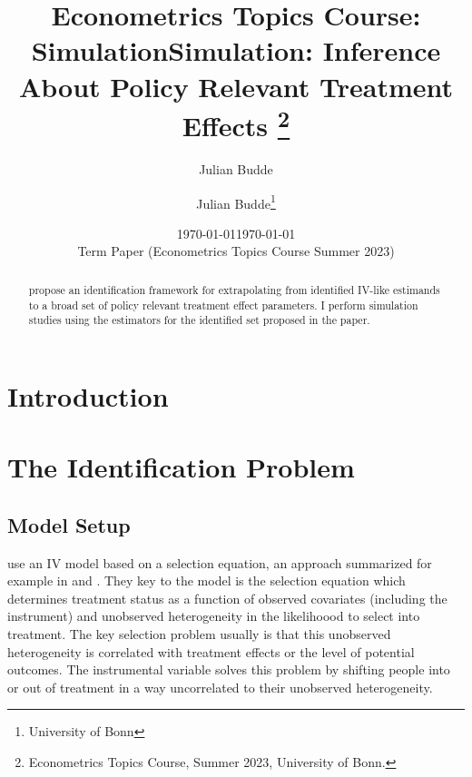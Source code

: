 \documentclass{article}
\title{\Large Econometrics Topics Course: Simulation}
\author{Julian Budde}
\date{\today}
\begin{document}
\title{Simulation: Inference About Policy Relevant Treatment Effects \thanks{Econometrics Topics Course, Summer 2023, University of Bonn.}}  

\author{Julian Budde\thanks{University of Bonn}}
 
\date{\today \\ \vspace{1em} Term Paper (Econometrics Topics Course Summer 2023)} 
\maketitle 


\begin{abstract}
\citet{mogstad2018using} propose an identification framework for extrapolating from identified IV-like estimands to a broad set of policy relevant treatment effect parameters.
I perform simulation studies using the estimators for the identified set proposed in the paper.
\end{abstract} 

\clearpage
\pagebreak

\tableofcontents
\clearpage
\newpage
\section{Introduction}

\section{The Identification Problem}
\subsection{Model Setup}
\citet{mogstad2018using} use an IV model based on a selection equation, an approach summarized for example in \citet{heckman2007econometric1} and \citet{heckman2007econometric2}.
They key to the model is the selection equation which determines treatment status as a function of observed covariates (including the instrument) and unobserved heterogeneity in the likelihoood to select into treatment.
The key selection problem usually is that this unobserved heterogeneity is correlated with treatment effects or the level of potential outcomes.
The instrumental variable solves this problem by shifting people into or out of treatment in a way uncorrelated to their unobserved heterogeneity.
\end{document}
